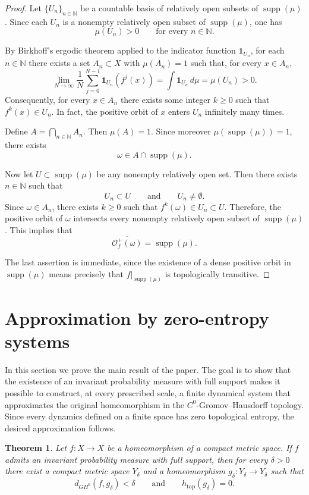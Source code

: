 \documentclass{amsart}
\numberwithin{equation}{section}
\newtheorem{theorem}{Theorem}[section]
\theoremstyle{remark}
\DeclareMathOperator{\supp}{supp}
\DeclareMathOperator{\topo}{top}
\begin{document}
\begin{proof}
Let $\{U_n\}_{n\in\mathbb N}$ be a countable basis of relatively open subsets of $\supp(\mu)$. Since each $U_n$ is a nonempty relatively open subset of $\supp(\mu)$, one has
\[
\mu(U_n)>0
\qquad\text{for every }n\in\mathbb N.
\]

By Birkhoff's ergodic theorem applied to the indicator function $\mathbf 1_{U_n}$, for each $n\in\mathbb N$ there exists a set $A_n\subset X$ with $\mu(A_n)=1$ such that, for every $x\in A_n$,
\[
\lim_{N\to\infty}\frac1N\sum_{j=0}^{N-1}\mathbf 1_{U_n}(f^j(x))
=
\int \mathbf 1_{U_n}\,d\mu
=
\mu(U_n)>0.
\]
Consequently, for every $x\in A_n$ there exists some integer $k\ge 0$ such that
$f^k(x)\in U_n$. In fact, the positive orbit of $x$ enters $U_n$ infinitely many times.

Define $A=\bigcap_{n\in\mathbb N}A_n$. Then $\mu(A)=1$. Since moreover $\mu(\supp(\mu))=1$, there exists
\[
\omega\in A\cap \supp(\mu).
\]

Now let $U\subset \supp(\mu)$ be any nonempty relatively open set. Then there exists $n\in\mathbb N$ such that
\[
U_n\subset U
\qquad\text{and}\qquad
U_n\neq\emptyset.
\]
Since $\omega\in A_n$, there exists $k\ge 0$ such that $f^k(\omega)\in U_n\subset U$.
Therefore, the positive orbit of $\omega$ intersects every nonempty relatively open subset of $\supp(\mu)$. This implies that
\[
\overline{\mathcal O_f^+(\omega)}=\supp(\mu).
\]

The last assertion is immediate, since the existence of a dense positive orbit in $\supp(\mu)$ means precisely that $f|_{\supp(\mu)}$ is topologically transitive.
\end{proof}

\section{Approximation by zero-entropy systems}

In this section we prove the main result of the paper. The goal is to show that the existence of an invariant probability measure with full support makes it possible to construct, at every prescribed scale, a finite dynamical system that approximates the original homeomorphism in the $C^0$-Gromov--Hausdorff topology. Since every dynamics defined on a finite space has zero topological entropy, the desired approximation follows.

\begin{theorem}\label{thm:main}
Let $f:X\to X$ be a homeomorphism of a compact metric space. If $f$ admits an invariant probability measure with full support, then for every $\delta>0$ there exist a compact metric space $Y_\delta$ and a homeomorphism $g_\delta:Y_\delta\to Y_\delta$ such that
\[
d_{GH^0}(f,g_\delta)<\delta
\qquad\text{and}\qquad
h_{\topo}(g_\delta)=0.
\]
\end{theorem}
\end{document}
